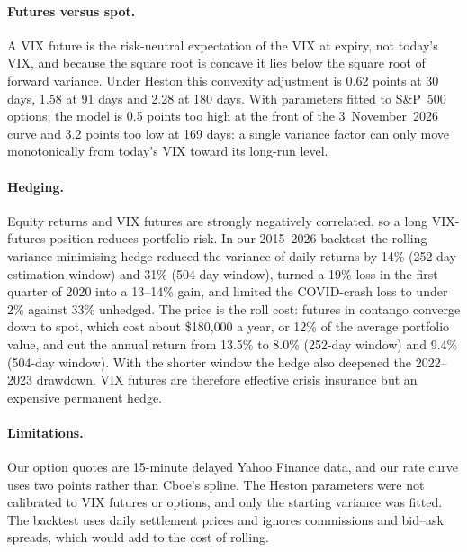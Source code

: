 \documentclass[11pt,a4paper]{article}
\begin{document}
\paragraph{Futures versus spot.} A VIX future is the risk-neutral expectation of the VIX at expiry, not today's VIX, and because the square root is concave it lies below the square root of forward variance. Under Heston this convexity adjustment is 0.62 points at 30 days, 1.58 at 91 days and 2.28 at 180 days. With parameters fitted to S\&P~500 options, the model is 0.5 points too high at the front of the 3~November~2026 curve and 3.2 points too low at 169 days: a single variance factor can only move monotonically from today's VIX toward its long-run level.

\paragraph{Hedging.} Equity returns and VIX futures are strongly negatively correlated, so a long VIX-futures position reduces portfolio risk. In our 2015--2026 backtest the rolling variance-minimising hedge reduced the variance of daily returns by 14\% (252-day estimation window) and 31\% (504-day window), turned a 19\% loss in the first quarter of 2020 into a 13--14\% gain, and limited the COVID-crash loss to under 2\% against 33\% unhedged. The price is the roll cost: futures in contango converge down to spot, which cost about \$180{,}000 a year, or 12\% of the average portfolio value, and cut the annual return from 13.5\% to 8.0\% (252-day window) and 9.4\% (504-day window). With the shorter window the hedge also deepened the 2022--2023 drawdown. VIX futures are therefore effective crisis insurance but an expensive permanent hedge.

\paragraph{Limitations.} Our option quotes are 15-minute delayed Yahoo Finance data, and our rate curve uses two points rather than Cboe's spline. The Heston parameters were not calibrated to VIX futures or options, and only the starting variance was fitted. The backtest uses daily settlement prices and ignores commissions and bid--ask spreads, which would add to the cost of rolling.

\appendix

\end{document}
